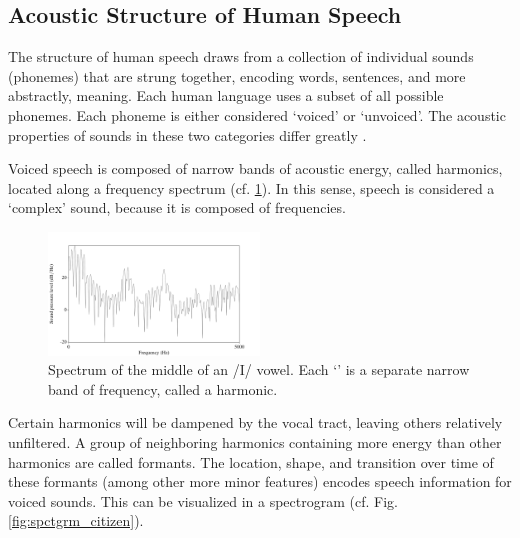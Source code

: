 \subsection{Acoustic Structure of Human Speech}

The structure of human speech draws from a collection of individual sounds (phonemes) that are strung together, encoding words, sentences, and more abstractly, meaning.  Each human language uses a subset of all possible phonemes.  Each phoneme is either considered `voiced' or `unvoiced'.  The acoustic properties of sounds in these two categories differ greatly \DIFaddbegin {}\DIFaddend .

Voiced speech is composed of narrow bands of acoustic energy, called harmonics, located along a frequency spectrum (cf. \DIFdelbegin {}\DIFdelend \DIFaddbegin {}\DIFaddend \ref{fig:spctrm5k}).  In this sense, speech is considered a `complex' sound, because it is composed of \DIFdelbegin {}\DIFdelend \DIFaddbegin {}\DIFaddend frequencies.
%
\begin{figure}
\centering
  \includegraphics[width=0.5\textwidth]{figure/spctrm5k.png}
  \caption{Spectrum of the middle of an /I/ vowel.  Each `\DIFdelbegin {}\DIFdelend \DIFaddbegin {}\DIFaddend ' is a separate narrow band of frequency, called a harmonic.}
  \label{fig:spctrm5k}
\end{figure}
%
Certain harmonics will be dampened by the vocal tract, leaving others relatively unfiltered.  A group of neighboring harmonics containing more energy than other harmonics are called formants.  The location, shape, and transition over time of these formants (among other more minor features) \DIFdelbegin {}\DIFdelend encodes speech information for voiced sounds.  This can be \DIFdelbegin {}\DIFdelend visualized in a spectrogram (cf. Fig. \ref{fig:spctgrm_citizen}).

